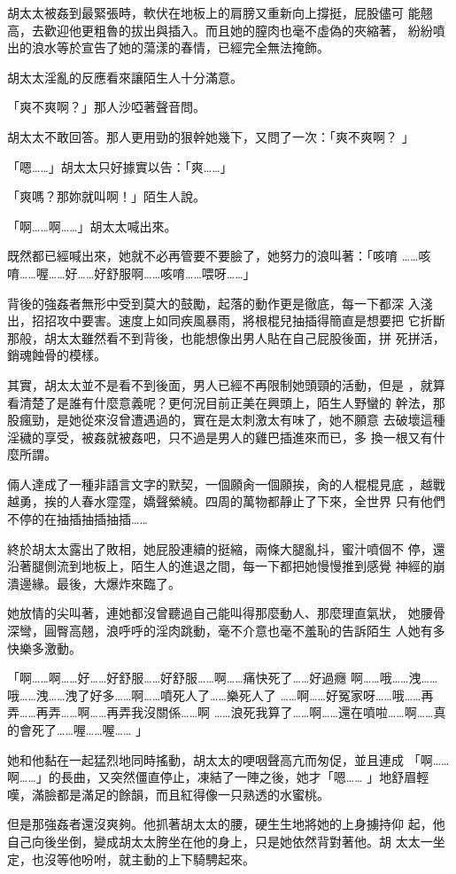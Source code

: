 胡太太被姦到最緊張時，軟伏在地板上的肩膀又重新向上撐挺，屁股儘可
能翹高，去歡迎他更粗魯的拔出與插入。而且她的膣肉也毫不虛偽的夾縮著，
紛紛噴出的浪水等於宣告了她的蕩漾的春情，已經完全無法掩飾。

胡太太淫亂的反應看來讓陌生人十分滿意。

「爽不爽啊？」那人沙啞著聲音問。

胡太太不敢回答。那人更用勁的狠幹她幾下，又問了一次：「爽不爽啊？
」

「嗯……」胡太太只好據實以告：「爽……」

「爽嗎？那妳就叫啊！」陌生人說。

「啊……啊……」胡太太喊出來。

既然都已經喊出來，她就不必再管要不要臉了，她努力的浪叫著：「咳唷
……咳唷……喔……好……好舒服啊……咳唷……喂呀……」

背後的強姦者無形中受到莫大的鼓勵，起落的動作更是徹底，每一下都深
入淺出，招招攻中要害。速度上如同疾風暴雨，將根棍兒抽插得簡直是想要把
它折斷那般，胡太太雖然看不到背後，也能想像出男人貼在自己屁股後面，拼
死拼活，銷魂蝕骨的模樣。

其實，胡太太並不是看不到後面，男人已經不再限制她頭頸的活動，但是
，就算看清楚了是誰有什麼意義呢？更何況目前正美在興頭上，陌生人野蠻的
幹法，那股瘋勁，是她從來沒曾遭遇過的，實在是太刺激太有味了，她不願意
去破壞這種淫穢的享受，被姦就被姦吧，只不過是男人的雞巴插進來而已，多
換一根又有什麼所謂。

倆人達成了一種非語言文字的默契，一個願肏一個願挨，肏的人棍棍見底
，越戰越勇，挨的人春水霪霪，嬌聲縈繞。四周的萬物都靜止了下來，全世界
只有他們不停的在抽插抽插抽插……

終於胡太太露出了敗相，她屁股連續的挺縮，兩條大腿亂抖，蜜汁噴個不
停，還沿著腿側流到地板上，陌生人的進退之間，每一下都把她慢慢推到感覺
神經的崩潰邊緣。最後，大爆炸來臨了。

她放情的尖叫著，連她都沒曾聽過自己能叫得那麼動人、那麼理直氣狀，
她腰骨深彎，圓臀高翹，浪呼呼的淫肉跳動，毫不介意也毫不羞恥的告訴陌生
人她有多快樂多激動。

「啊……啊……好……好舒服……好舒服……啊……痛快死了……好過癮
啊……哦……洩……哦……洩……洩了好多……啊……噴死人了……樂死人了
……啊……好冤家呀……哦……再弄……再弄……啊……再弄我沒關係……啊
……浪死我算了……啊……還在噴啦……啊……真的會死了……喔……喔……
」

她和他黏在一起猛烈地同時搖動，胡太太的哽咽聲高亢而匆促，並且連成
「啊……啊……」的長曲，又突然僵直停止，凍結了一陣之後，她才「嗯……
」地舒眉輕嘆，滿臉都是滿足的餘韻，而且紅得像一只熟透的水蜜桃。

但是那強姦者還沒爽夠。他抓著胡太太的腰，硬生生地將她的上身擄持仰
起，他自己向後坐倒，變成胡太太胯坐在他的身上，只是她依然背對著他。胡
太太一坐定，也沒等他吩咐，就主動的上下騎騁起來。

